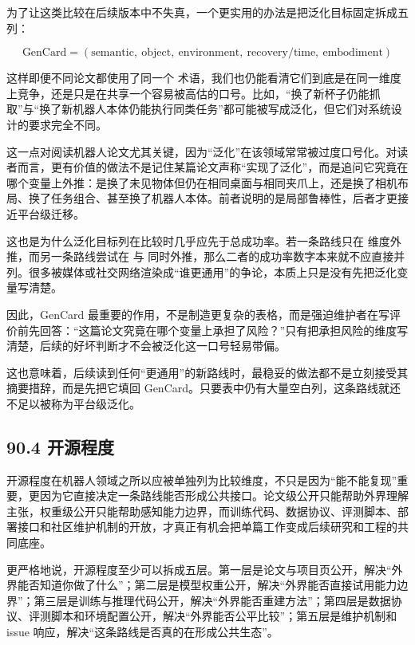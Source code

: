 为了让这类比较在后续版本中不失真，一个更实用的办法是把泛化目标固定拆成五列：

\begingroup
\scriptsize
\begin{equation*}
\text{GenCard} = (\text{semantic},\ \text{object},\ \text{environment},\ \text{recovery/time},\ \text{embodiment})
\end{equation*}
\endgroup

这样即便不同论文都使用了同一个 \texttt{} 术语，我们也仍能看清它们到底是在同一维度上竞争，还是只是在共享一个容易被高估的口号。比如，“换了新杯子仍能抓取”与“换了新机器人本体仍能执行同类任务”都可能被写成泛化，但它们对系统设计的要求完全不同。

这一点对阅读机器人论文尤其关键，因为“泛化”在该领域常常被过度口号化。对读者而言，更有价值的做法不是记住某篇论文声称“实现了泛化”，而是追问它究竟在哪个变量上外推：是换了未见物体但仍在相同桌面与相同夹爪上，还是换了相机布局、换了任务组合、甚至换了机器人本体。前者说明的是局部鲁棒性，后者才更接近平台级迁移。

这也是为什么泛化目标列在比较时几乎应先于总成功率。若一条路线只在 \texttt{} 维度外推，而另一条路线尝试在 \texttt{} 与  同时外推，那么二者的成功率数字本来就不应直接并列。很多被媒体或社交网络渲染成“谁更通用”的争论，本质上只是没有先把泛化变量写清楚。

因此，GenCard 最重要的作用，不是制造更复杂的表格，而是强迫维护者在写评价前先回答：“这篇论文究竟在哪个变量上承担了风险？”只有把承担风险的维度写清楚，后续的好坏判断才不会被泛化这一口号轻易带偏。

这也意味着，后续读到任何“更通用”的新路线时，最稳妥的做法都不是立刻接受其摘要措辞，而是先把它填回 GenCard。只要表中仍有大量空白列，这条路线就还不足以被称为平台级泛化。

\subsection*{90.4 开源程度}


开源程度在机器人领域之所以应被单独列为比较维度，不只是因为“能不能复现”重要，更因为它直接决定一条路线能否形成公共接口。论文级公开只能帮助外界理解主张，权重级公开只能帮助感知能力边界，而训练代码、数据协议、评测脚本、部署接口和社区维护机制的开放，才真正有机会把单篇工作变成后续研究和工程的共同底座。

更严格地说，开源程度至少可以拆成五层。第一层是论文与项目页公开，解决“外界能否知道你做了什么”；第二层是模型权重公开，解决“外界能否直接试用能力边界”；第三层是训练与推理代码公开，解决“外界能否重建方法”；第四层是数据协议、评测脚本和环境配置公开，解决“外界能否公平比较”；第五层是维护机制和 issue 响应，解决“这条路线是否真的在形成公共生态”。

